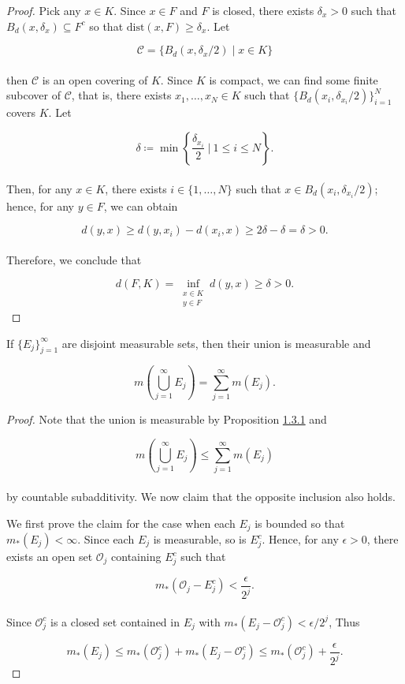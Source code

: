 \documentclass[12pt, a4paper, openany, twoside]{book}
\theoremstyle{definition}
\theoremstyle{remark}
\theoremstyle{plain}
\numberwithin{equation}{section}
\begin{document}
\vspace{5mm}
\begin{proof}
    Pick any $x\in K$. Since $x\in F$ and $F$ is closed, there exists $\delta_x>0$ such that $B_d(x,\delta_x)\subseteq F^c$ so that $\mathrm{dist}(x,F)\geq\delta_x$. Let 

    \[\mathcal{C}=\big\{B_d\left(x,\delta_x/2\right)\mid x\in K\big\}\]
    \\
    then $\mathcal{C}$ is an open covering of $K$. Since $K$ is compact, we can find some finite subcover of $\mathcal{C}$, that is, there exists $x_1,\dots, x_N\in K$ such that $\{B_d(x_i,\delta_{x_i}/2)\}_{i=1}^{N}$ covers $K$. Let 

    \[\delta\coloneqq\min\left\{\frac{\delta_{x_i}}{2}\ \Big|\ 1\leq i\leq N\right\}.\]
    \\
    Then, for any $x\in K$, there exists $i\in\{1,\dots,N\}$ such that $x\in B_d(x_i, \delta_{x_i}/2)$; hence, for any $y\in F$, we can obtain

    \[d(y,x)\geq d(y,x_i)-d(x_i,x)\geq 2\delta-\delta=\delta>0.\]
    \\
    Therefore, we conclude that 

    \[d(F,K)=\inf_{\substack{x\in K\\ y\in F}}{d(y,x)}\geq\delta>0.\]
\end{proof}
\vspace{5mm}
\begin{tcolorbox}[colback=yellow!10!white,colframe=red!75!black,title=Theorem 1.3.3]\label{Theorem 1.3.3}
    If $\{E_j\}_{j=1}^{\infty}$ are disjoint measurable sets, then their union is measurable and

    \[m\left(\bigcup_{j=1}^{\infty}{E_j}\right)=\sum_{j=1}^{\infty}{m(E_j)}.\]
\end{tcolorbox}
\begin{proof}
    Note that the union is measurable by Proposition \hyperref[Proposition 1.3.1]{1.3.1} and 
    
    \[m\left(\bigcup_{j=1}^{\infty}{E_j}\right)\leq\sum_{j=1}^{\infty}{m(E_j)}\]
    \\
    by countable subadditivity. We now claim that the opposite inclusion also holds.
    
    
    
    We first prove the claim for the case when each $E_j$ is bounded so that $m_*(E_j)<\infty$. Since each $E_j$ is measurable, so is $E_j^c$. Hence, for any $\epsilon>0$, there exists an open set $\mathcal{O}_j$ containing $E_j^c$ such that 

    \[m_*(\mathcal{O}_j-E_j^c)<\frac{\epsilon}{2^j}.\]
    \\
    Since $\mathcal{O}_j^c$ is a closed set contained in $E_j$ with $m_*(E_j-\mathcal{O}_j^c)<\epsilon/2^j$, Thus
    
    \[m_*(E_j)\leq m_*(\mathcal{O}_j^c)+m_*(E_j-\mathcal{O}_j^c)\leq m_*(\mathcal{O}_j^c)+\frac{\epsilon}{2^j}.\]
\end{proof}
\end{document}
